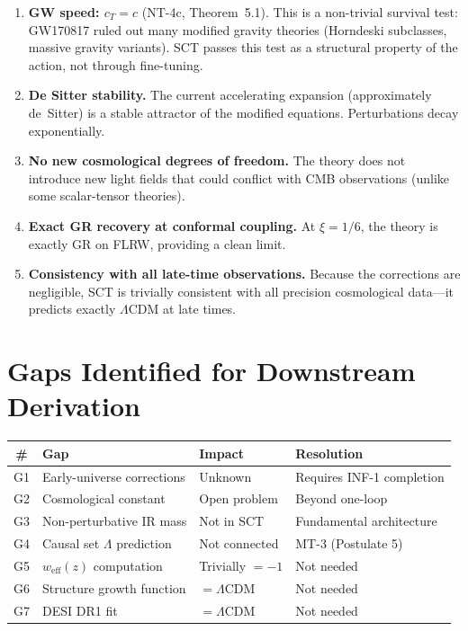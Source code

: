 \documentclass[11pt,a4paper]{article}
\theoremstyle{plain}
\theoremstyle{definition}
\theoremstyle{remark}
\begin{document}
\begin{enumerate}
  \item \textbf{GW speed: $c_T = c$} (NT-4c, Theorem~5.1). This is a
    non-trivial survival test: GW170817 ruled out many modified gravity
    theories (Horndeski subclasses, massive gravity variants). SCT
    passes this test as a structural property of the action, not through
    fine-tuning.

  \item \textbf{De Sitter stability.} The current accelerating
    expansion (approximately de~Sitter) is a stable attractor of the
    modified equations. Perturbations decay exponentially.

  \item \textbf{No new cosmological degrees of freedom.} The theory does
    not introduce new light fields that could conflict with CMB
    observations (unlike some scalar-tensor theories).

  \item \textbf{Exact GR recovery at conformal coupling.} At $\xi = 1/6$,
    the theory is exactly GR on FLRW, providing a clean limit.

  \item \textbf{Consistency with all late-time observations.} Because
    the corrections are negligible, SCT is trivially consistent with
    all precision cosmological data---it predicts exactly $\Lambda$CDM
    at late times.
\end{enumerate}

\section{Gaps Identified for Downstream Derivation}
\label{sec:gaps}

\begin{center}
\begin{tabular}{clll}
\toprule
\textbf{\#} & \textbf{Gap} & \textbf{Impact} & \textbf{Resolution} \\
\midrule
G1 & Early-universe corrections & Unknown & Requires INF-1 completion \\
G2 & Cosmological constant & Open problem & Beyond one-loop \\
G3 & Non-perturbative IR mass & Not in SCT & Fundamental architecture \\
G4 & Causal set $\Lambda$ prediction & Not connected & MT-3 (Postulate 5) \\
G5 & $w_{\mathrm{eff}}(z)$ computation & Trivially $= -1$ & Not needed \\
G6 & Structure growth function & $= \Lambda$CDM & Not needed \\
G7 & DESI DR1 fit & $= \Lambda$CDM & Not needed \\
\bottomrule
\end{tabular}
\end{center}
\end{document}
